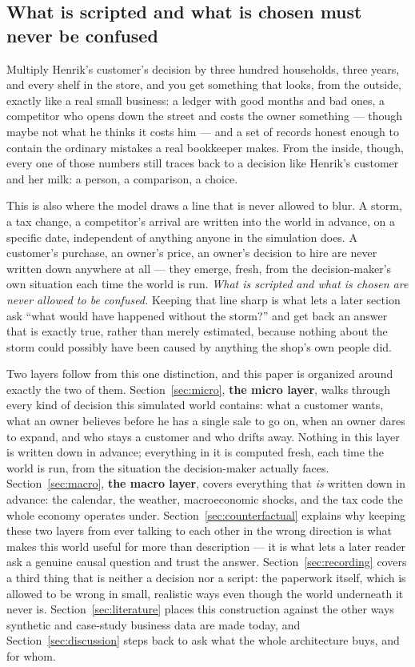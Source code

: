 \documentclass[12pt,a4paper]{article}
\begin{document}
\subsection{What is scripted and what is chosen must never be confused}

Multiply Henrik's customer's decision by three hundred households, three
years, and every shelf in the store, and you get something that looks,
from the outside, exactly like a real small business: a ledger with good
months and bad ones, a competitor who opens down the street and costs
the owner something --- though maybe not what he thinks it costs him ---
and a set of records honest enough to contain the ordinary mistakes a
real bookkeeper makes. From the inside, though, every one of those
numbers still traces back to a decision like Henrik's customer and her
milk: a person, a comparison, a choice.

This is also where the model draws a line that is never allowed to
blur. A storm, a tax change, a competitor's arrival are written into the
world in advance, on a specific date, independent of anything anyone in
the simulation does. A customer's purchase, an owner's price, an owner's
decision to hire are never written down anywhere at all --- they emerge,
fresh, from the decision-maker's own situation each time the world is
run. \emph{What is scripted and what is chosen are never allowed to be
confused.} Keeping that line sharp is what lets a later section ask
``what would have happened without the storm?'' and get back an answer
that is exactly true, rather than merely estimated, because nothing
about the storm could possibly have been caused by anything the shop's
own people did.

Two layers follow from this one distinction, and this paper is organized
around exactly the two of them. Section~\ref{sec:micro}, \textbf{the
micro layer}, walks through every kind of decision this simulated world
contains: what a customer wants, what an owner believes before he has a
single sale to go on, when an owner dares to expand, and who stays a
customer and who drifts away. Nothing in this layer is written down in
advance; everything in it is computed fresh, each time the world is run,
from the situation the decision-maker actually faces.
Section~\ref{sec:macro}, \textbf{the macro layer}, covers everything
that \emph{is} written down in advance: the calendar, the weather,
macroeconomic shocks, and the tax code the whole economy operates
under. Section~\ref{sec:counterfactual} explains why keeping these two
layers from ever talking to each other in the wrong direction is what
makes this world useful for more than description --- it is what lets
a later reader ask a genuine causal question and trust the answer.
Section~\ref{sec:recording} covers a third thing that is neither a
decision nor a script: the paperwork itself, which is allowed to be
wrong in small, realistic ways even though the world underneath it never
is. Section~\ref{sec:literature} places this construction against the
other ways synthetic and case-study business data are made today, and
Section~\ref{sec:discussion} steps back to ask what the whole
architecture buys, and for whom.
\end{document}

